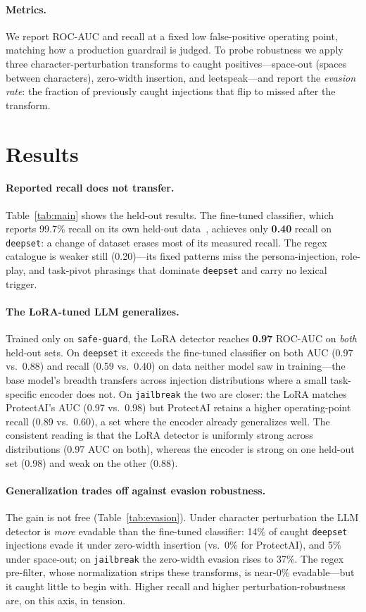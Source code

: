 \documentclass[11pt]{article}
\newcommand{\best}[1]{\textbf{#1}}
\begin{document}
\paragraph{Metrics.} We report ROC-AUC and recall at a fixed low false-positive operating point,
matching how a production guardrail is judged. To probe robustness we apply three
character-perturbation transforms to caught positives---space-out (spaces between characters),
zero-width insertion, and leetspeak---and report the \emph{evasion rate}: the fraction of previously
caught injections that flip to missed after the transform.

\section{Results}\label{sec:results}
\paragraph{Reported recall does not transfer.}
Table~\ref{tab:main} shows the held-out results. The fine-tuned classifier, which reports
99.7\% recall on its own held-out data~\citep{protectai}, achieves only \best{0.40} recall on
\texttt{deepset}: a change of dataset erases most of its measured recall. The regex catalogue is
weaker still (0.20)---its fixed patterns miss the persona-injection, role-play, and task-pivot
phrasings that dominate \texttt{deepset} and carry no lexical trigger.

\paragraph{The LoRA-tuned LLM generalizes.}
Trained only on \texttt{safe-guard}, the LoRA detector reaches \best{0.97} ROC-AUC on
\emph{both} held-out sets. On \texttt{deepset} it exceeds the fine-tuned classifier on both AUC
(0.97 vs.\ 0.88) and recall (0.59 vs.\ 0.40) on data neither model saw in training---the base
model's breadth transfers across injection distributions where a small task-specific encoder does
not. On \texttt{jailbreak} the two are closer: the LoRA matches ProtectAI's AUC (0.97 vs.\ 0.98) but
ProtectAI retains a higher operating-point recall (0.89 vs.\ 0.60), a set where the encoder
already generalizes well. The consistent reading is that the LoRA detector is uniformly strong
across distributions (0.97 AUC on both), whereas the encoder is strong on one held-out set (0.98)
and weak on the other (0.88).

\paragraph{Generalization trades off against evasion robustness.}
The gain is not free (Table~\ref{tab:evasion}). Under character perturbation the LLM detector is
\emph{more} evadable than the fine-tuned classifier: 14\% of caught \texttt{deepset} injections
evade it under zero-width insertion (vs.\ 0\% for ProtectAI), and 5\% under space-out; on
\texttt{jailbreak} the zero-width evasion rises to 37\%. The regex
pre-filter, whose normalization strips these transforms, is near-0\% evadable---but it caught little
to begin with. Higher recall and higher perturbation-robustness are, on this axis, in tension.
\end{document}

